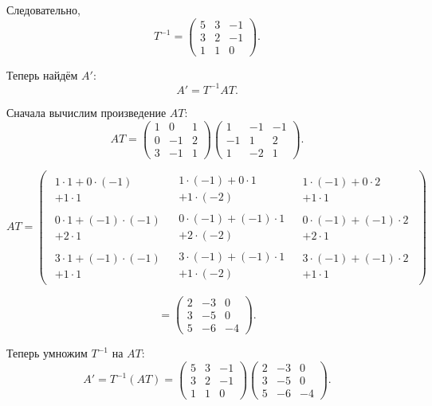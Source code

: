 Следовательно,
\[
T^{-1}=
\begin{pmatrix}
5 & 3 & -1\\
3 & 2 & -1\\
1 & 1 & 0
\end{pmatrix}.
\]

Теперь найдём $A'$:
\[
A'=T^{-1}AT.
\]

Сначала вычислим произведение $AT$:
\[
AT=
\begin{pmatrix}
1 & 0 & 1\\
0 & -1 & 2\\
3 & -1 & 1
\end{pmatrix}
\begin{pmatrix}
1 & -1 & -1\\
-1 & 1 & 2\\
1 & -2 & 1
\end{pmatrix}.
\]

\[
AT=
\begin{pmatrix}
\substack{1\cdot1+0\cdot(-1)\\+1\cdot1} &
\substack{1\cdot(-1)+0\cdot1\\+1\cdot(-2)} &
\substack{1\cdot(-1)+0\cdot2\\+1\cdot1} \\

\substack{0\cdot1+(-1)\cdot(-1)\\+2\cdot1} &
\substack{0\cdot(-1)+(-1)\cdot1\\+2\cdot(-2)} &
\substack{0\cdot(-1)+(-1)\cdot2\\+2\cdot1} \\

\substack{3\cdot1+(-1)\cdot(-1)\\+1\cdot1} &
\substack{3\cdot(-1)+(-1)\cdot1\\+1\cdot(-2)} &
\substack{3\cdot(-1)+(-1)\cdot2\\+1\cdot1}
\end{pmatrix}
\]

\[
=
\begin{pmatrix}
2 & -3 & 0\\
3 & -5 & 0\\
5 & -6 & -4
\end{pmatrix}.
\]

Теперь умножим $T^{-1}$ на $AT$:
\[
A'=T^{-1}(AT)=
\begin{pmatrix}
5 & 3 & -1\\
3 & 2 & -1\\
1 & 1 & 0
\end{pmatrix}
\begin{pmatrix}
2 & -3 & 0\\
3 & -5 & 0\\
5 & -6 & -4
\end{pmatrix}.
\]

